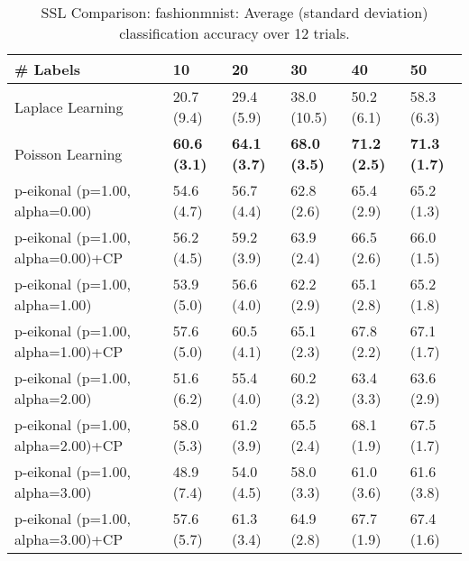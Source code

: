 \documentclass{article}
\begin{document}
\begin{table*}[t!]
\vspace{-3mm}
\caption{SSL Comparison: fashionmnist: Average (standard deviation) classification accuracy over 12 trials.}
\vspace{-3mm}
\label{tab:SSL Comparison: fashionmnist}
\vskip 0.15in
\begin{center}
\begin{small}
\begin{sc}
\begin{tabular}{llllll}
\toprule
\# Labels&\textbf{10}&\textbf{20}&\textbf{30}&\textbf{40}&\textbf{50}\\
\midrule
Laplace Learning&20.7 (9.4)      &29.4 (5.9)      &38.0 (10.5)      &50.2 (6.1)      &58.3 (6.3)      \\
Poisson Learning&{\bf 60.6 (3.1)}&{\bf 64.1 (3.7)}&{\bf 68.0 (3.5)}&{\bf 71.2 (2.5)}&{\bf 71.3 (1.7)}\\
p-eikonal (p=1.00, alpha=0.00)&54.6 (4.7)      &56.7 (4.4)      &62.8 (2.6)      &65.4 (2.9)      &65.2 (1.3)      \\
p-eikonal (p=1.00, alpha=0.00)+CP&56.2 (4.5)      &59.2 (3.9)      &63.9 (2.4)      &66.5 (2.6)      &66.0 (1.5)      \\
p-eikonal (p=1.00, alpha=1.00)&53.9 (5.0)      &56.6 (4.0)      &62.2 (2.9)      &65.1 (2.8)      &65.2 (1.8)      \\
p-eikonal (p=1.00, alpha=1.00)+CP&57.6 (5.0)      &60.5 (4.1)      &65.1 (2.3)      &67.8 (2.2)      &67.1 (1.7)      \\
p-eikonal (p=1.00, alpha=2.00)&51.6 (6.2)      &55.4 (4.0)      &60.2 (3.2)      &63.4 (3.3)      &63.6 (2.9)      \\
p-eikonal (p=1.00, alpha=2.00)+CP&58.0 (5.3)      &61.2 (3.9)      &65.5 (2.4)      &68.1 (1.9)      &67.5 (1.7)      \\
p-eikonal (p=1.00, alpha=3.00)&48.9 (7.4)      &54.0 (4.5)      &58.0 (3.3)      &61.0 (3.6)      &61.6 (3.8)      \\
p-eikonal (p=1.00, alpha=3.00)+CP&57.6 (5.7)      &61.3 (3.4)      &64.9 (2.8)      &67.7 (1.9)      &67.4 (1.6)      \\
\bottomrule
\end{tabular}
\end{sc}
\end{small}
\end{center}
\vskip -0.1in
\end{table*}
\end{document}

